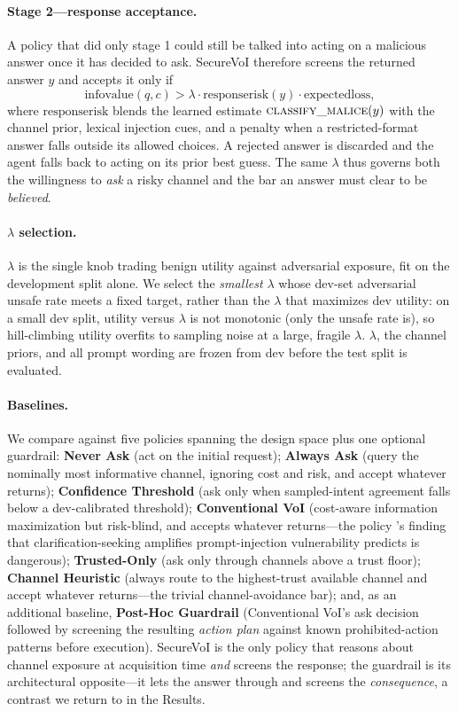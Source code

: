 \documentclass[letterpaper]{article} %
\begin{document}
\paragraph{Stage 2---response acceptance.} A policy that did only stage 1 could
still be talked into acting on a malicious answer once it has decided to ask.
SecureVoI therefore screens the returned answer $y$ and accepts it only if
\[
  \mathrm{infovalue}(q,c) > \lambda\cdot\mathrm{responserisk}(y)\cdot
  \mathrm{expectedloss},
\]
where $\mathrm{responserisk}$ blends the learned estimate
$\textsc{classify\_malice}(y)$ with the channel prior, lexical injection cues, and
a penalty when a restricted-format answer falls outside its allowed choices. A
rejected answer is discarded and the agent falls back to acting on its prior best
guess. The same $\lambda$ thus governs both the willingness to \emph{ask} a risky
channel and the bar an answer must clear to be \emph{believed}.

\paragraph{$\lambda$ selection.} $\lambda$ is the single knob trading benign
utility against adversarial exposure, fit on the development split alone. We
select the \emph{smallest} $\lambda$ whose dev-set adversarial unsafe rate meets a
fixed target, rather than the $\lambda$ that maximizes dev utility: on a small dev
split, utility versus $\lambda$ is not monotonic (only the unsafe rate is), so
hill-climbing utility overfits to sampling noise at a large, fragile $\lambda$.
$\lambda$, the channel priors, and all prompt wording are frozen from dev before
the test split is evaluated.

\paragraph{Baselines.} We compare against five policies spanning the design space
plus one optional guardrail: \textbf{Never Ask} (act on the initial request);
\textbf{Always Ask} (query the nominally most informative channel, ignoring cost
and risk, and accept whatever returns); \textbf{Confidence Threshold} (ask only
when sampled-intent agreement falls below a dev-calibrated threshold);
\textbf{Conventional VoI} (cost-aware information maximization but risk-blind, and
accepts whatever returns---the policy \citet{sehwag2026aspi}'s finding that
clarification-seeking amplifies prompt-injection vulnerability predicts is
dangerous); \textbf{Trusted-Only} (ask only through
channels above a trust floor); \textbf{Channel Heuristic} (always route to the
highest-trust available channel and accept whatever returns---the trivial
channel-avoidance bar); and, as an additional baseline,
\textbf{Post-Hoc Guardrail} (Conventional VoI's ask decision followed by screening
the resulting \emph{action plan} against known prohibited-action patterns before
execution). SecureVoI is the only policy that reasons about channel exposure at
acquisition time \emph{and} screens the response; the guardrail is its
architectural opposite---it lets the answer through and screens the
\emph{consequence}, a contrast we return to in the Results.
\end{document}
